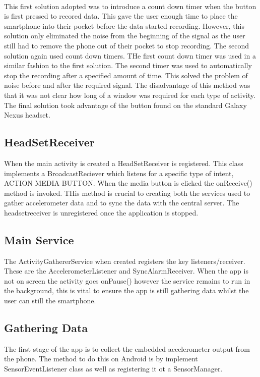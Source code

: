 \paragraph{}
This first solution adopted was to introduce a count down timer when the button is first pressed to recored data. This gave the user enough time to place the smartphone into their pocket before the data started recording. However, this solution only eliminated the noise from the beginning of the signal as the user still had to remove the phone out of their pocket to stop recording. The second solution again used count down timers. THe first count down timer was used in a similar fashion to the first solution. The second timer was used to automatically stop the recording after a specified amount of time. This solved the problem of noise before and after the required signal. The disadvantage of this method was that it was not clear how long of a window was required for each type of activity. The final solution took advantage of the button found on the standard Galaxy Nexus headset. 

\subsection{HeadSetReceiver} %
\label{sub:subsection_headset}
When the main activity is created a HeadSetReceiver is registered. This class implements a BroadcastReciever which listens for a specific type of intent, ACTION MEDIA BUTTON. When the media button is clicked the onReceive() method is invoked. THis method is crucial to creating both the services used to gather accelerometer data and to sync the data with the central server. The headsetreceiver is unregistered once the application is stopped.

\subsection{Main Service} %
\label{sub:main_service}
The ActivityGathererService when created registers the key listeners/receiver. These are the AccelerometerListener and SyncAlarmReceiver. When the app is not on screen the activity goes onPause() however the service remains to run in the background, this is vital to ensure the app is still gathering data whilst the user can still the smartphone.

\subsection{Gathering Data} %
\label{sub:data_gathering}
The first stage of the app is to collect the embedded accelerometer output from the phone. The method to do this on Android is by implement SensorEventListener class as well as registering it ot a SensorManager. 
